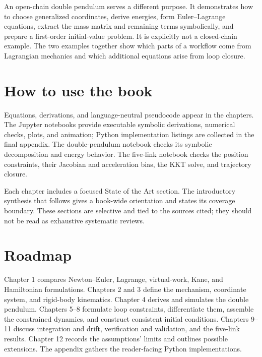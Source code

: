 An open-chain double pendulum serves a different purpose. It demonstrates how to choose generalized coordinates, derive energies, form Euler--Lagrange equations, extract the mass matrix and remaining terms symbolically, and prepare a first-order initial-value problem. It is explicitly not a closed-chain example. The two examples together show which parts of a workflow come from Lagrangian mechanics and which additional equations arise from loop closure.

\section*{How to use the book}
Equations, derivations, and language-neutral pseudocode appear in the chapters. The Jupyter notebooks provide executable symbolic derivations, numerical checks, plots, and animation; Python implementation listings are collected in the final appendix. The double-pendulum notebook checks its symbolic decomposition and energy behavior. The five-link notebook checks the position constraints, their Jacobian and acceleration bias, the KKT solve, and trajectory closure.

Each chapter includes a focused State of the Art section. The introductory synthesis that follows gives a book-wide orientation and states its coverage boundary. These sections are selective and tied to the sources cited; they should not be read as exhaustive systematic reviews.

\section*{Roadmap}
Chapter 1 compares Newton--Euler, Lagrange, virtual-work, Kane, and Hamiltonian formulations. Chapters 2 and 3 define the mechanism, coordinate system, and rigid-body kinematics. Chapter 4 derives and simulates the double pendulum. Chapters 5--8 formulate loop constraints, differentiate them, assemble the constrained dynamics, and construct consistent initial conditions. Chapters 9--11 discuss integration and drift, verification and validation, and the five-link results. Chapter 12 records the assumptions' limits and outlines possible extensions. The appendix gathers the reader-facing Python implementations.